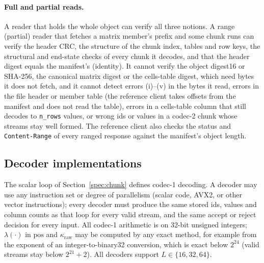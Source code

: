 \paragraph{Full and partial reads.}
A reader that holds the whole object can verify all three notions. A range (partial) reader that fetches a matrix
member's prefix and some chunk runs can verify the header CRC, the structure of the chunk index, tables and row keys,
the structural and end-state checks of every chunk it decodes, and that the header digest equals the manifest's
(identity). It cannot verify the object digest16 or SHA-256, the canonical matrix digest or the cells-table digest,
which need bytes it does not fetch, and it cannot detect errors (i)--(v) in the bytes it read, errors in the file
header or member table (the reference client takes offsets from the manifest and does not read the table), errors in a
cells-table column that still decodes to \texttt{n\_rows} values, or wrong ids or values in a codec-2 chunk whose
streams stay well formed. The reference client also checks the status and \texttt{Content-Range}
of every ranged response against the manifest's object length.

\subsection{Decoder implementations}
\label{spec:simd}
The scalar loop of Section~\ref{spec:chunk} defines codec-1 decoding. A decoder may use any instruction set or degree
of parallelism (scalar code, AVX2, or other vector instructions); every decoder must produce the same stored ids,
values and column counts as that loop for every valid stream, and the same accept or reject decision for every input.
All codec-1 arithmetic is on 32-bit unsigned integers; $\lambda(\cdot)$ in $\mathrm{pos}$ and $\kappa_{\mathrm{raw}}$ may
be computed by any exact method, for example from the exponent of an integer-to-binary32 conversion, which is exact
below $2^{24}$ (valid streams stay below $2^{21}+2$). All decoders support $L\in\{16,32,64\}$.

